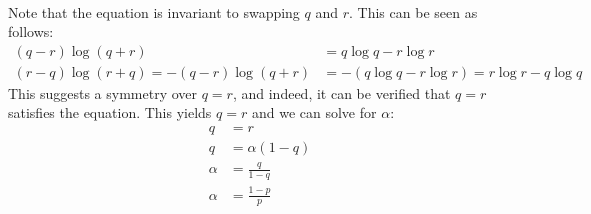 \documentclass[11pt]{article}
\begin{document}
\begin{subparts}
\begin{enumerate}
{\begin{align*}
                \end{align*}
                Note that the equation is invariant to swapping $q$ and $r$. This can be seen as follows:
                \begin{align*}
                    (q - r) \log (q + r) &= q \log q - r \log r \\
                    (r - q) \log (r + q) = -(q - r) \log (q + r) &= - (q \log q - r \log r) = r \log r - q \log q
                \end{align*}
                This suggests a symmetry over $q = r$, and indeed, it can be verified that $q = r$ satisfies the equation. This yields $q = r$ and we can solve for $\alpha$:
                \begin{align*}
                    q &= r \\
                    q &= \alpha (1 - q) \\
                    \alpha &= \frac{q}{1 - q} \\
                    \alpha &= \frac{1 - p}{p}
                \end{align*}
            }
        \end{enumerate}
        

        

    \end{subparts}
\end{document}
